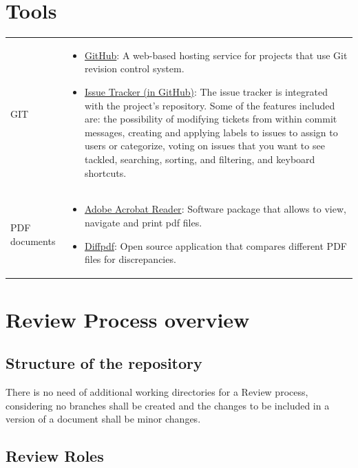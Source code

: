 \documentclass{template/openetcs_article}
\begin{document}
\section{Tools}

\begin{flushleft}

\begin{tabular}{|m{3cm}|m{11cm}|}
\hline
\rowcolor{myblue}
\multicolumn{2}{|c|}{Tools} \\\hline
GIT &
\begin{itemize}
\item \underline{GitHub}: A web-based hosting service for projects that use Git revision control system.
\item \underline{Issue Tracker (in GitHub)}: The issue tracker is integrated with the project's repository. Some of the features included are: the possibility of modifying tickets from within commit messages,
creating and applying labels to issues to assign to users or categorize, voting on issues that you want to see tackled, searching, sorting, and filtering, and keyboard shortcuts.
\end{itemize}
\\\hline
PDF documents &
\begin{itemize}
\item \underline{Adobe Acrobat Reader}: Software package that allows to view, navigate and print pdf files.
\item \underline{Diffpdf}: Open source application that compares different PDF files for discrepancies. 
\end{itemize}
\\\hline
\end{tabular}
\end{flushleft}

\section{Review Process overview}
\subsection{Structure of the repository}
 
There is no need of additional working directories for a Review process, considering no branches shall be created and the changes to be included in a version of a document shall be minor changes.

\subsection{Review Roles}
\end{document}
